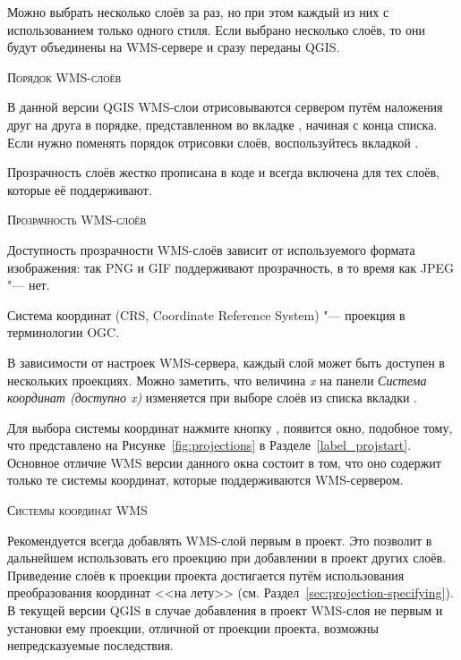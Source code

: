 Можно выбрать несколько слоёв за раз, но при этом каждый из них с
использованием только одного стиля. Если выбрано несколько слоёв, то
они будут объединены на WMS-сервере и сразу переданы QGIS.

\begin{Tip}[ht]\caption{\textsc{Порядок WMS-слоёв}}
В данной версии QGIS WMS-слои отрисовываются сервером путём наложения
друг на друга в порядке, представленном во вкладке , начиная с конца
списка. Если нужно поменять порядок отрисовки слоёв, воспользуйтесь вкладкой
.
\end{Tip}

\label{ogc-wms-transparency}

Прозрачность слоёв жестко прописана в коде и всегда включена для тех
слоёв, которые её поддерживают.

\begin{Tip}[ht]\caption{\textsc{Прозрачность WMS-слоёв}}
Доступность прозрачности WMS-слоёв зависит от используемого формата изображения:
так PNG и GIF поддерживают прозрачность, в то время как JPEG "--- нет.
\end{Tip}


Система координат (CRS, Coordinate Reference System) "--- проекция в
терминологии OGC.

В зависимости от настроек WMS-сервера, каждый слой может быть доступен в
нескольких проекциях. Можно заметить, что величина \textsl{x}
на панели \textsl{Система координат (доступно x)}
изменяется при выборе слоёв из списка вкладки .

Для выбора системы координат нажмите кнопку , появится
окно, подобное тому, что представлено на Рисунке~\ref{fig:projections} в
Разделе~\ref{label_projstart}. Основное отличие WMS версии данного окна
состоит в том, что оно содержит только те системы координат, которые
поддерживаются WMS-сервером.

\begin{Tip}[ht]\caption{\textsc{Системы координат WMS}}
Рекомендуется всегда добавлять WMS-слой первым в проект. Это позволит в
дальнейшем использовать его проекцию при добавлении в проект других слоёв.
Приведение слоёв к проекции проекта достигается путём использования
преобразования координат <<на лету>> (см. Раздел~\ref{sec:projection-specifying}).
В текущей версии QGIS в случае добавления в проект WMS-слоя не первым и
установки ему проекции, отличной от проекции проекта, возможны
непредсказуемые последствия.
\end{Tip}


